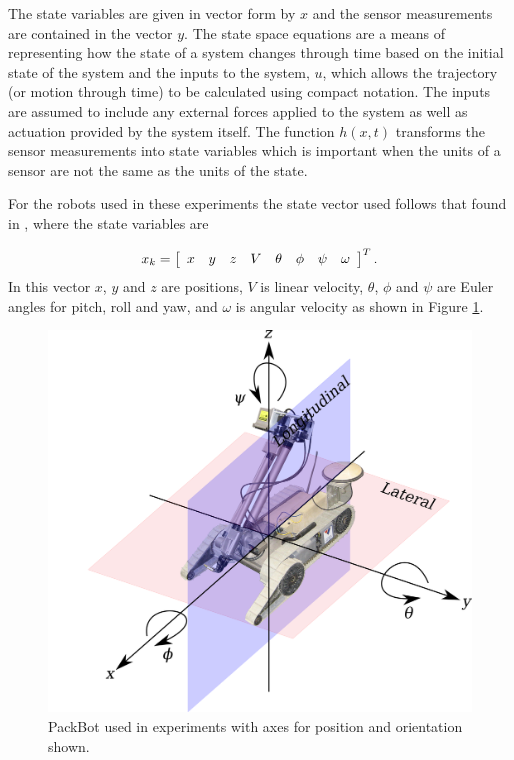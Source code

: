 The state variables are given in vector form by $x$ and the sensor measurements are contained in the vector $y$. The state space equations are a means of representing how the state of a system changes through time based on the initial state of the system and the inputs to the system, $u$, which allows the trajectory (or motion through time) to be calculated using compact notation. The inputs are assumed to include any external forces applied to the system as well as actuation provided by the system itself. The function $h(x,t)$ transforms the sensor measurements into state variables which is important when the units of a sensor are not the same as the units of the state.

For the robots used in these experiments the state vector used follows that found in \cite{Kelly_1994_338}, \cite{Kelly_1994_333} where the state variables are

\begin{align*}
x_k = \left[\begin{array}{c c c c c c c c} x & y & z & V & \theta & \phi & \psi & \omega \end{array}\right]^T.
\end{align*}
In this vector $x$, $y$ and $z$ are positions, $V$ is linear velocity, $\theta$, $\phi$ and $\psi$ are Euler angles for pitch, roll and yaw, and $\omega$ is angular velocity as shown in Figure \ref{fig:robotaxes}.

\begin{figure}[ht!]
    \centering
    \includegraphics[width=.69\textwidth]{images/packbotaxes}
    \caption{PackBot used in experiments with axes for position and orientation shown.}
    \label{fig:robotaxes}
\end{figure}

